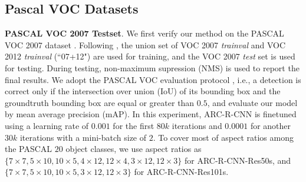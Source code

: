 \documentclass[10pt,twocolumn,letterpaper]{article}
\begin{document}
\subsection{Pascal VOC Datasets}
\vspace{-1mm}
\textbf{PASCAL VOC 2007 Testset}. We first verify our method on the PASCAL VOC 2007 dataset \cite{pascal}. Following \cite{faster_rcnn,rfcn}, the union set of VOC 2007 \textit{trainval} and VOC 2012 \textit{trainval} (``07+12") are used for training, and the VOC 2007 \textit{test} set is used for testing. 
During testing, non-maximum supression (NMS) is used to report the final results.
We adopt the PASCAL VOC evaluation protocol \cite{pascal}, i.e., a detection is correct only if the intersection over union (IoU) of its bounding box and the groundtruth bounding box are equal or greater than $0.5$, and evaluate our model by mean average precision (mAP). 
In this experiment, ARC-R-CNN is finetuned using a learning rate of $0.001$ for the first $80k$ iterations and $0.0001$ for another $30k$ iterations with a mini-batch size of $2$. 
To cover most of aspect ratios among the PASCAL $20$ object classes, we use aspect ratios as $\{7\times7, 5\times10, 10\times5, 4\times12, 12\times4,3\times12, 12\times3\}$ for ARC-R-CNN-Res50s, and $\{7\times7, 5\times10, 10\times5, 3\times12, 12\times3\}$ for ARC-R-CNN-Res101s.


\begin{table} 
\begin{center}
\end{center}
\caption{mAP results with IoU $\ge 0.5$ of Faster-RCNN, R-FCN and ARC-R-CNN on PASCAL VOC 2007 test set. ResNet-50 and ResNet-101 are used as the backbone architectures. Time is evaluated on a Nvidia K40 GPU.}
\label{tab:07coarse} 
\vspace{-3mm}
\end{table}
\end{document}
